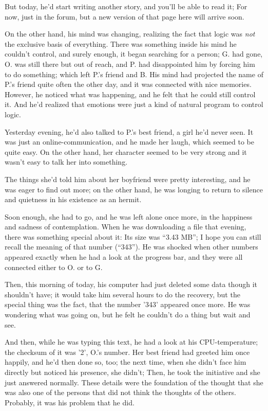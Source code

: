 But today, he'd start writing another story, and you'll be able to read it; For now, just in the forum, but a new version of that page here will arrive soon.

On the other hand, his mind was changing, realizing the fact that logic was \emph{not} the exclusive basis of everything. There was something inside his mind he couldn't control, and surely enough, it began searching for a person; G. had gone, O. was still there but out of reach, and P. had disappointed him by forcing him to do something; which left P.'s friend and B. His mind had projected the name of P.'s friend quite often the other day, and it was connected with nice memories. However, he noticed what was happening, and he felt that he could still control it.
And he'd realized that emotions were just a kind of natural program to control logic.

Yesterday evening, he'd also talked to P.'s best friend, a girl he'd never seen. It was just an online-communication, and he made her laugh, which seemed to be quite easy. On the other hand, her character seemed to be very strong and it wasn't easy to talk her into something.

The things she'd told him about her boyfriend were pretty interesting, and he was eager to find out more; on the other hand, he was longing to return to silence and quietness in his existence as an hermit.

Soon enough, she had to go, and he was left alone once more, in the happiness and sadness of contemplation. When he was downloading a file that evening, there was something special about it: Its size was \enquote{3.43 MB}; I hope you can still recall the meaning of that number (\enquote{343}). He was shocked when other numbers appeared exactly when he had a look at the progress bar, and they were all connected either to O. or to G.

Then, this morning of today, his computer had just deleted some data though it shouldn't have; it would take him several hours to do the recovery, but the special thing was the fact, that the number '343' appeared once more.
He was wondering what was going on, but he felt he couldn't do a thing but wait and see.

And then, while he was typing this text, he had a look at his CPU-temperature; the checksum of it was '2', O.'s number. 
Her best friend had greeted him once happily, and he'd then done so, too; the next time, when she didn't face him directly but noticed his presence, she didn't; Then, he took the initiative and she just answered normally. These details were the foundation of the thought that she was also one of the persons that did not think the thoughts of the others. 
Probably, it was his problem that he did.


